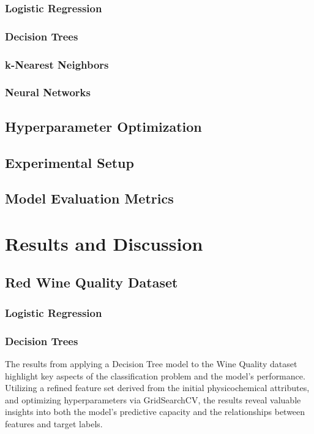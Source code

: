 \documentclass[conference]{IEEEtran}
\begin{document}
\subsubsection{Logistic Regression}
\subsubsection{Decision Trees}
\subsubsection{k-Nearest Neighbors}
\subsubsection{Neural Networks}

\subsection{Hyperparameter Optimization}

\subsection{Experimental Setup}
\subsection{Model Evaluation Metrics}


\section{Results and Discussion}
\subsection{Red Wine Quality Dataset}
\subsubsection{Logistic Regression}
\subsubsection{Decision Trees}
The results from applying a Decision Tree model to the Wine Quality dataset highlight key aspects of the classification problem and the model's performance. Utilizing a refined feature set derived from the initial physicochemical attributes, and optimizing hyperparameters via GridSearchCV, the results reveal valuable insights into both the model's predictive capacity and the relationships between features and target labels.
\end{document}
